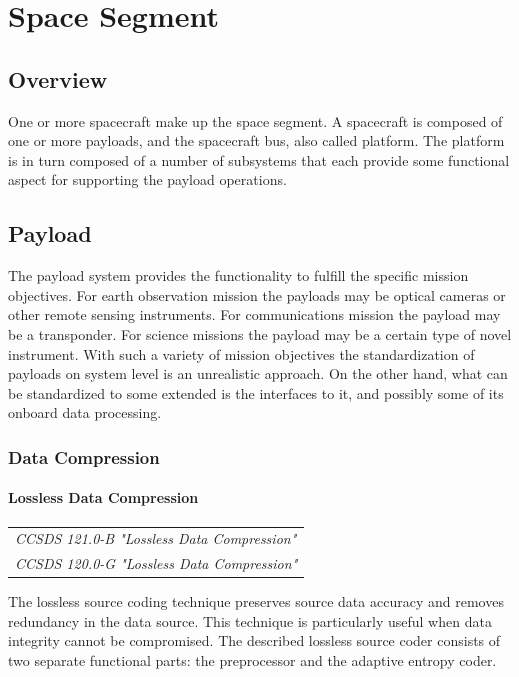 \chapter{Space Segment}

\section{Overview}

One or more spacecraft make up the space segment. A spacecraft is composed of one or more payloads, and the spacecraft bus, also called platform. The platform is in turn composed of a number of subsystems that each provide some functional aspect for supporting the payload operations.

\section{Payload}

The payload system provides the functionality to fulfill the specific mission objectives. For earth observation mission the payloads may be optical cameras or other remote sensing instruments. For communications mission the payload may be a transponder. For science missions the payload may be a certain type of novel instrument. With such a variety of mission objectives the standardization of payloads on system level is an unrealistic approach. On the other hand, what can be standardized to some extended is the interfaces to it, and possibly some of its onboard data processing.

\subsection{Data Compression}

\subsubsection{Lossless Data Compression}

\begin{tabular}{l}
\textit{CCSDS 121.0-B "Lossless Data Compression" \cite{CCSDS-120.0-G}} \\
\textit{CCSDS 120.0-G "Lossless Data Compression" \cite{CCSDS-121.0-B}}
\end{tabular}

The lossless source coding technique preserves source data accuracy and removes redundancy in the data source. This technique is particularly useful when data integrity cannot be compromised. The described lossless source coder consists of two separate functional parts: the preprocessor and the adaptive entropy coder. 

